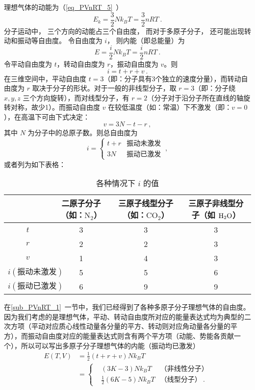 


理想气体的动能为（\autoref{eq_PVnRT_5}~）
\begin{equation}
E_k = \frac32 Nk_B T = \frac{3}{2}nRT~.
\end{equation}
分子运动中， 三个方向的动能占三个自由度， 而对于多原子分子， 还可能出现转动和振动等自由度。 令自由度为 $i$， 则内能（即总能量）为
\begin{equation}\label{eq_IdgEng_1}
E = \frac{i}{2}Nk_B T = \frac{i}{2}nRT~.
\end{equation}
令平动自由度为 $t$，转动自由度为 $r$，振动自由度为 $v$。则
\begin{equation}
i=t+r+v~.
\end{equation}
在三维空间中，平动自由度 $t=3$（即：分子具有3个独立的速度分量），而转动自由度为 $r$ 取决于分子的形状。对于一般的非线型分子，取 $r=3$（即：分子绕 $x,y,z$ 三个方向旋转），而对线型分子，有 $r=2$（分子对于沿分子所在直线的轴旋转对称，故少1）。而振动自由度 $v$ 在较低温度（如：常温）下不激发（即：$v=0$），在高温下可由下式决定：
\begin{equation}
v=3N-t-r~,
\end{equation}
其中 $N$ 为分子中的总原子数。则总自由度为
\begin{equation}
i=\left\{\begin{matrix}{t+r}&{\text{振动未激发}}\\{3N}&{\text{振动已激发}}\end{matrix}\right.~,
\end{equation}
或者列为如下表格：\begin{table}[ht]
\centering
\caption{各种情况下 $i$ 的值}\label{tab_IdgEng_1}
\begin{tabular}{|c|c|c|c|}
\hline
 & 二原子分子（如：$\text{N}_2$） & 三原子线型分子（如：$\text{CO}_2$） & 三原子非线型分子（如 $\text H_2\text O$） \\
\hline
$t$ & 3 & 3 & 3 \\
\hline
$r$ & 2 & 2 & 3 \\
\hline
$v$ & 1 & 4 & 3 \\
\hline
$i(\text{振动未激发})$ & 5 & 5 & 6 \\
\hline
$i(\text{振动已激发})$ & 6 & 9 & 9 \\
\hline
\end{tabular}
\end{table}
在\autoref{sub_PVnRT_1}~一节中，我们已经得到了各种多原子分子理想气体的自由度。因为我们考虑的是理想气体，平动、转动自由度所对应的能量表达式均为典型的二次方项（平动对应质心线性动量各分量的平方、转动则对应角动量各分量的平方），而振动自由度对应的能量表达式则含有两个平方项（动能、势能各贡献一个），所以可以写出多原子分子理想气体的内能（振动均已激发）
\begin{equation}
\begin{aligned}
E(T, V) &= \frac 12 (t+r+v)Nk_B T \\
&= \left\{\begin{aligned}
&(3K-3)Nk_BT &\text{（非线性分子）}\\
&\frac12(6K-5)Nk_BT&\text{（线型分子）} ~.
\end{aligned}\right.
\end{aligned}
\end{equation}

